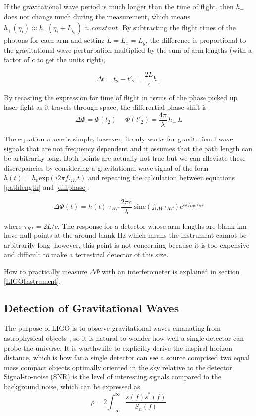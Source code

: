 	If the gravitational wave period is much longer than the time of flight, then $h_{+}$ does not change much during the measurement, which means $h_{+}(\eta_i) \approx h_{+}(\eta_i + L_{\eta_i}) \approx constant$.  By subtracting the flight times of the photons for each arm and setting $L = L_x = L_y$, the difference is proportional to the gravitational wave perturbation multiplied by the sum of arm lengths (with a factor of $c$ to get the units right),
	
	\begin{equation}
	\Delta t = t_2 - t'_{2} = \frac{2L}{c} h_{+}
	\end{equation}
	
	By recasting the expression for time of flight in terms of the phase picked up laser light as it travels through space, the differential phase shift is
	\begin{equation}\label{diffphase}
	\Delta \Phi = \Phi(t_{2}) - \Phi(t'_{2}) = \frac{4 \pi}{\lambda} \, h_{+} \, L
	\end{equation}
	
	The equation above is simple, however, it only works for gravitational wave signals that are not frequency dependent and it assumes that the path length can be arbitrarily long. Both points are actually not true \cite{Saulson} but we can alleviate these discrepancies by considering a gravitational wave signal of the form $h(t) = h_0 \text{exp} (i 2 \pi f_{GW} t)$  and repeating the calculation between equations \ref{pathlength} and \ref{diffphase}:
	
	\begin{equation}\label{gwsinc}
	\Delta \Phi (t) = h(t) \; \tau_{RT} \; \frac{2 \pi c}{\lambda} \; \text{sinc}(f_{GW} \tau_{RT}) e^{i \pi f_{GW} \tau_{RT}}
	\end{equation}
	
	where $\tau_{RT} = 2L/c$.  The response for a detector whose arm lengths are blank km have null points at the around blank Hz which means the instrument cannot be arbitrarily long, however, this point is not concerning because it is too expensive and difficult to make a terrestrial detector of this size.
	
	How to practically measure $\Delta \Phi$ with an interferometer is explained in section \ref{LIGOInstrument}.

	\subsection{Detection of Gravitational Waves}
	The purpose of LIGO is to observe gravitational waves emanating from astrophysical objects \cite{NSFproposal}, so it is natural to wonder how well a single detector can probe the universe.  It is worthwhile to explicitly derive the inspiral horizon distance, which is how far a single detector can see a source comprised two equal mass compact objects optimally oriented in the sky relative to the detector.  Signal-to-noise (SNR) is the level of interesting signals compared to the background noise, which can be expressed as
	\begin{equation}\label{SNR}
	\rho = 2 \int_{-\infty}^{\infty} \frac{ \tilde{s}(f) \tilde{s}^*(f) }{S_n(f)}
	\end{equation}
	
